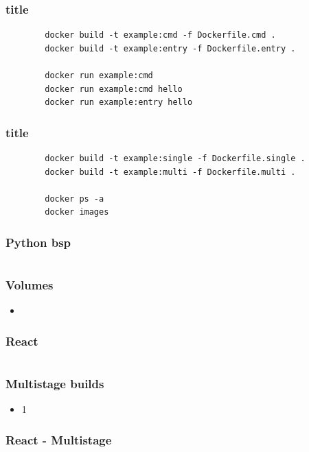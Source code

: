 \documentclass[22pt,handout]{beamer}
\begin{document}
\begin{frame}[fragile]
    \frametitle{title}
    \begin{verbatim}
        docker build -t example:cmd -f Dockerfile.cmd .
        docker build -t example:entry -f Dockerfile.entry .

        docker run example:cmd
        docker run example:cmd hello
        docker run example:entry hello
    \end{verbatim}
\end{frame}

\begin{frame}[fragile]
    \frametitle{title}
    \begin{verbatim}
        docker build -t example:single -f Dockerfile.single .
        docker build -t example:multi -f Dockerfile.multi .

        docker ps -a
        docker images
    \end{verbatim}
\end{frame}

\begin{frame}[fragile]
    \frametitle{Python bsp}
    \inputminted[fontsize=\footnotesize, frame=lines]{dockerfile}{../examples/Dockerfile.cmd}
\end{frame}

\begin{frame}[t]
    \frametitle{Volumes}
    \begin{itemize}
        \item 
    \end{itemize} 
\end{frame}

\begin{frame}[fragile]
    \frametitle{React}
    \inputminted[fontsize=\footnotesize, frame=lines]{dockerfile}{../examples/Dockerfile.cmd}
\end{frame}

\begin{frame}[t]
    \frametitle{Multistage builds}
    \begin{itemize}
        \item 1
    \end{itemize} 
\end{frame}

\begin{frame}[fragile]
    \frametitle{React - Multistage}
    \inputminted[fontsize=\footnotesize, frame=lines]{dockerfile}{../examples/Dockerfile.cmd}
\end{frame}
\end{document}
